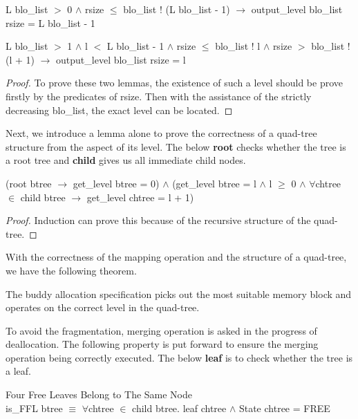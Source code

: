 \documentclass[runningheads]{llncs}
\begin{document}
\begin{lemma}
L blo\_list $>$ 0 $\wedge$ rsize $\leq$ blo\_list ! (L blo\_list - 1) $\longrightarrow$ output\_level blo\_list rsize = L blo\_list - 1
\end{lemma}

\begin{lemma}
L blo\_list $>$ 1 $\wedge$ l $<$ L blo\_list - 1 $\wedge$ rsize $\leq$ blo\_list ! l $\wedge$ rsize $>$ blo\_list ! (l + 1) $\longrightarrow$ output\_level blo\_list rsize = l
\end{lemma}

\begin{proof}
To prove these two lemmas, the existence of such a level should be prove firstly by the predicates of rsize. Then with the assistance of the strictly decreasing blo\_list, the exact level can be located.
\end{proof}

Next, we introduce a lemma alone to prove the correctness of a quad-tree structure from the aspect of its level. The below \textbf{root} checks whether the tree is a root tree and \textbf{child} gives us all immediate child nodes.

\begin{lemma}
(root btree $\longrightarrow$ get\_level btree = 0) $\wedge$ (get\_level btree = l $\wedge$ l $\geq$ 0 $\wedge$ $\forall$chtree $\in$ child btree $\longrightarrow$ get\_level chtree = l + 1)
\end{lemma}

\begin{proof}
Induction can prove this because of the recursive structure of the quad-tree.
\end{proof}

With the correctness of the mapping operation and the structure of a quad-tree, we have the following theorem.

\begin{theorem}
The buddy allocation specification picks out the most suitable memory block and operates on the correct level in the quad-tree.
\end{theorem}

To avoid the fragmentation, merging operation is asked in the progress of deallocation. The following property is put forward to ensure the merging operation being correctly executed. The below \textbf{leaf} is to check whether the tree is a leaf.

\begin{definition} {Four Free Leaves Belong to The Same Node} \\
is\_FFL btree $\equiv$ $\forall$chtree $\in$ child btree. leaf chtree $\wedge$ State chtree = FREE
\end{definition}
\end{document}
